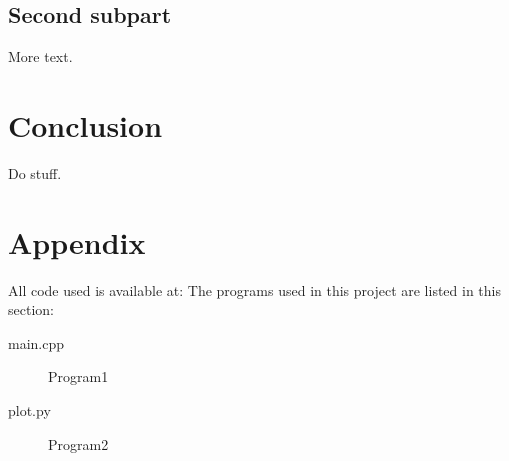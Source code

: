 \documentclass[%
 reprint,
 nobalance,
 amsmath,amssymb,
 aps,
]{revtex4-1}
\begin{document}
\subsection{\label{sec:Sub2}Second subpart}
More text.




\section{Conclusion}
Do stuff.

\section{Appendix}
All code used is available at: %
The programs used in this project are listed in this section:

\begin{description}
\item [main.cpp] Program1
\item [plot.py] Program2
\end{description}

\end{document}
